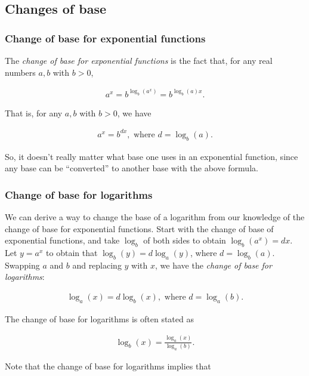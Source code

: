 \subsection*{Changes of base}

\subsubsection*{Change of base for exponential functions}

The \textit{change of base for exponential functions} is the fact that, for any real numbers $a, b$ with $b > 0$,

\begin{align*}
    a^x = b^{\log_b(a^x)} = b^{\log_b(a) x}.
\end{align*}

That is, for any $a, b$ with $b > 0$, we have

\begin{align*}
    a^x = b^{dx}, \text{ where $d = \log_b(a)$}.
\end{align*}

So, it doesn't really matter what base one uses in an exponential function, since any base can be ``converted'' to another base with the above formula.

\subsubsection*{Change of base for logarithms}

We can derive a way to change the base of a logarithm from our knowledge of the change of base for exponential functions. Start with the change of base of exponential functions, and take $\log_b$ of both sides to obtain $\log_b(a^x) = dx$. Let $y = a^x$ to obtain that ${\log_b(y) = d\log_a(y)}$, where $d = \log_b(a)$. Swapping $a$ and $b$ and replacing $y$ with $x$, we have the \textit{change of base for logarithms}:

\begin{align*}
    \log_a(x) = d\log_b(x), \text{ where $d = \log_a(b)$}.
\end{align*}

The change of base for logarithms is often stated as

\begin{align*}
    \log_b(x) = \frac{\log_a(x)}{\log_a(b)}.
\end{align*}

Note that the change of base for logarithms implies that


